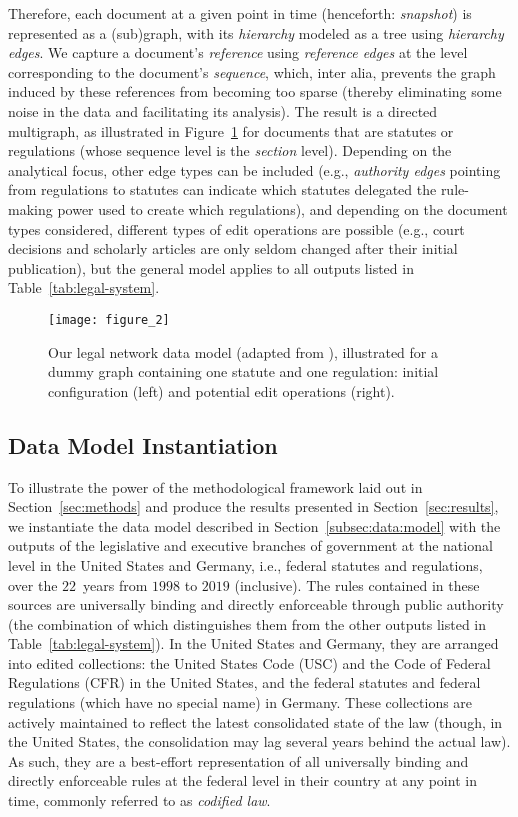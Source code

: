 Therefore, each document at a given point in time (henceforth: \emph{snapshot}) is represented as a (sub)graph, with its \emph{hierarchy} modeled as a tree using \emph{hierarchy edges}.
We capture a document's \emph{reference} using \emph{reference edges} at the level corresponding to the document's \emph{sequence}, which, inter alia, prevents the graph induced by these references from becoming too sparse (thereby eliminating some noise in the data and facilitating its analysis).
The result is a directed multigraph, as illustrated in Figure~\ref{fig:model} for documents that are statutes or regulations (whose sequence level is the \emph{section} level). 
Depending on the analytical focus, other edge types can be included (e.g., \emph{authority edges} pointing from regulations to statutes can indicate which statutes delegated the rule-making power used to create which regulations), 
and depending on the document types considered, different types of edit operations are possible (e.g., court decisions and scholarly articles are only seldom changed after their initial publication), 
but the general model applies to all outputs listed in Table~\ref{tab:legal-system}.

\begin{figure}
	\centering
	\texttt{[image: figure\_2]}
	\caption{Our legal network data model (adapted from \cite{katz2020}), illustrated for a dummy graph containing one statute and one regulation: initial configuration (left) and potential edit operations (right).}\label{fig:model}
\end{figure}

\vspace*{6pt}
\subsection{Data Model Instantiation}\label{subsec:data:instance}
To illustrate the power of the methodological framework laid out in Section~\ref{sec:methods} and produce the results presented in Section~\ref{sec:results}, we instantiate the data model described in Section~\ref{subsec:data:model} with the outputs of the legislative and executive branches of government at the national level in the United States and Germany, i.e., federal statutes and regulations, over the $22$~years from $1998$ to $2019$ (inclusive).
The rules contained in these sources are universally binding and directly enforceable through public authority (the combination of which distinguishes them from the other outputs listed in Table~\ref{tab:legal-system}).
In the United States and Germany, they are arranged into edited collections: the United States Code (USC) and the Code of Federal Regulations (CFR) in the United States, and the federal statutes and federal regulations (which have no special name) in Germany.
These collections are actively maintained to reflect the latest consolidated state of the law (though, in the United States, the consolidation may lag several years behind the actual law).
As such, they are a best-effort representation of all universally binding and directly enforceable rules at the federal level in their country at any point in time, commonly referred to as \emph{codified law}.

